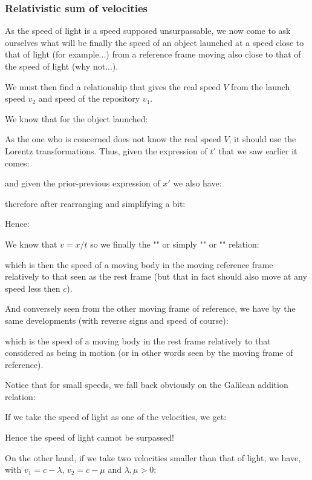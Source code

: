 	\subsubsection{Relativistic sum of velocities}
	As the speed of light is a speed supposed unsurpassable, we now come to ask ourselves what will be finally the speed of an object launched at a speed close to that of light (for example...) from a reference frame moving also close to that of the speed of light (why not...).

	We must then find a relationship that gives the real speed $V$ from the launch speed $v_2$ and speed of the repository $v_1$.

	We know that for the object launched:
	
	As the one who is concerned does not know the real speed $V$, it should use the Lorentz transformations. Thus, given the expression of $t'$ that we saw earlier it comes:
	
	and given the prior-previous expression of $x'$ we also have:
	
	therefore after rearranging and simplifying a bit:
	
	Hence:
	
	We know that $v=x/t$ so we finally the "" or simply "" or "" relation:
	
	which is then the speed of a moving body in the moving reference frame relatively to that seen as the rest frame (but that in fact should also move at any speed less then $c$).

	And conversely seen from the other moving frame of reference, we have by the same developments (with reverse signs and speed of course):
	
	which is the speed of a moving body in the rest frame relatively to that considered as being in motion (or in other words seen by the moving frame of reference).
	
	Notice that for small speeds, we fall back obviously on the Galilean addition relation:
	
	If we take the speed of light as one of the velocities, we get:
	
	Hence the speed of light cannot be surpassed!
	
	On the other hand, if we take two velocities smaller than that of light, we have, with $v_1=c-\lambda$, $v_2=c-\mu$ and $\lambda,\mu>0$:
	
